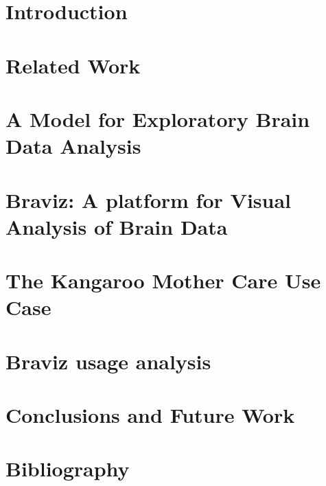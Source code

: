 \documentclass[12pt]{report}
\begin{document}
\tableofcontents

\chapter{Introduction}
\label{chap_intro}


\chapter{Related Work}
\label{chap_related}


\chapter{A Model for Exploratory Brain Data Analysis}
\label{chap_model}


\chapter{Braviz: A platform for Visual Analysis of Brain Data}
\label{chap_braviz}


\chapter{The Kangaroo Mother Care Use Case}
\label{chap_kmc}


\chapter{Braviz usage analysis}
\label{chap_analysis}


\chapter{Conclusions and Future Work}
\label{chap_conclusions}


\chapter*{Bibliography}
\printbibliography

\appendix

%
\end{document}
